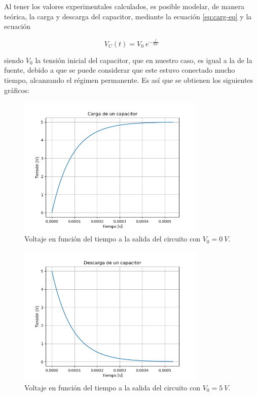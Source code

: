 \documentclass[a4paper]{article}
\begin{document}
Al tener los valores experimentales calculados, es posible modelar, de manera teórica, la carga y descarga del capacitor, mediante la ecuación \ref{eq:carg-eq} y la ecuación

\begin{equation}
	V_{C} (t) = V_{0} \ e^{-\frac{t}{RC}} 
	\label{eq:des-eq}
\end{equation}

siendo $ V_{0} $ la tensión inicial del capacitor, que en nuestro caso, es igual a la de la fuente, debido a que se puede considerar que este estuvo conectado mucho tiempo, alcanzando el régimen permanente.
Es así que se obtienen los siguientes gráficos:

\begin{figure}[H]
	\centering
	\includegraphics[width=0.8\textwidth]{Carga-transitoria-teorica.png}
\caption{Voltaje en función del tiempo a la salida del circuito con $ V_{0} = 0\ V $.}
	\label{fig:carg-teo}
\end{figure}

\begin{figure}[H]
	\centering
	\includegraphics[width=0.8\textwidth]{Descarga-transitoria-teorica.png}
	\caption{Voltaje en función del tiempo a la salida del circuito con $ V_{0} = 5\ V $.}
	\label{fig:desc-teo}
\end{figure}
\end{document}
